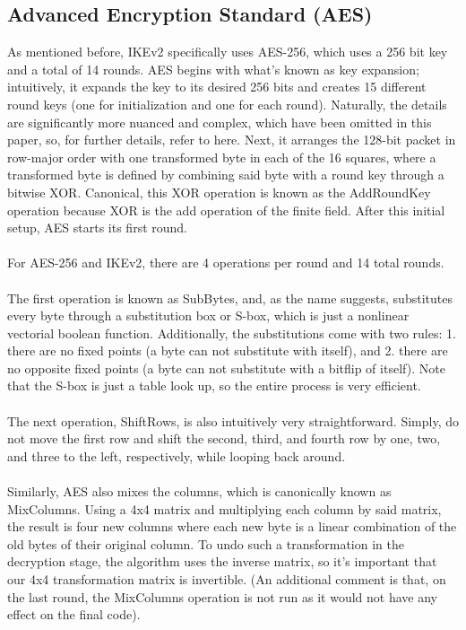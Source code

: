 \documentclass[runningheads]{llncs}
\begin{document}
\subsection{Advanced Encryption Standard (AES)}
As mentioned before, IKEv2 specifically uses AES-256, which uses a 256 bit key and a total of 14 rounds. AES begins with what’s known as key expansion; intuitively, it expands the key to its desired 256 bits and creates 15 different round keys (one for initialization and one for each round). Naturally, the details are significantly more nuanced and complex, which have been omitted in this paper, so, for further details, refer to here. \cite{improved_aes} Next, it arranges the 128-bit packet in row-major order with one transformed byte in each of the 16 squares, where a transformed byte is defined by combining said byte with a round key through a bitwise XOR. Canonical, this XOR operation is known as the AddRoundKey operation because XOR is the add operation of the finite field. After this initial setup, AES starts its first round.\\
\\
For AES-256 and IKEv2, there are 4 operations per round and 14 total rounds.\\
\\
The first operation is known as SubBytes, and, as the name suggests, substitutes every byte through a substitution box or S-box, which is just a nonlinear vectorial boolean function. \cite{generalities_vectorial} Additionally, the substitutions come with two rules: 1. there are no fixed points (a byte can not substitute with itself), and 2. there are no opposite fixed points (a byte can not substitute with a bitflip of itself). Note that the S-box is just a table look up, so the entire process is very efficient.\\
\\
The next operation, ShiftRows, is also intuitively very straightforward. Simply, do not move the first row and shift the second, third, and fourth row by one, two, and three to the left, respectively, while looping back around.\\
\\
Similarly, AES also mixes the columns, which is canonically known as MixColumns. Using a 4x4 matrix and multiplying each column by said matrix, the result is four new columns where each new byte is a linear combination of the old bytes of their original column. To undo such a transformation in the decryption stage, the algorithm uses the inverse matrix, so it's important that our 4x4 transformation matrix is invertible. (An additional comment is that, on the last round, the MixColumns operation is not run as it would not have any effect on the final code).
\end{document}

